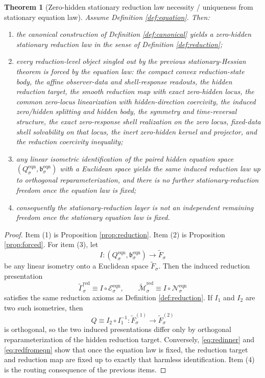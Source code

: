 \documentclass[11pt]{article}
\newcommand{\EqnTarget}[1]{Q_{#1}^{\mathrm{eqn}}}
\newcommand{\EqnPair}[1]{\mathfrak b_{#1}^{\mathrm{eqn}}}
\newcommand{\EqnResidual}[1]{\mathcal E_{#1}^{\mathrm{eqn}}}
\newcommand{\EqnLin}[1]{\mathcal N_{#1}^{\mathrm{eqn}}}
\newtheorem{theorem}{Theorem}
\begin{document}
\begin{theorem}[Zero-hidden stationary reduction law necessity / uniqueness from stationary equation law]
\label{thm:necessity}
Assume Definition \ref{def:equation}. Then:
\begin{enumerate}
    \item the canonical construction of Definition \ref{def:canonical} yields a zero-hidden stationary reduction law in the sense of Definition \ref{def:reduction};
    \item every reduction-level object singled out by the previous stationary-Hessian theorem is forced by the equation law: the compact convex reduction-state body, the affine observer-data and shell-response readouts, the hidden reduction target, the smooth reduction map with exact zero-hidden locus, the common zero-locus linearization with hidden-direction coercivity, the induced zero/hidden splitting and hidden body, the symmetry and time-reversal structure, the exact zero-response shell realization on the zero locus, fixed-data shell solvability on that locus, the inert zero-hidden kernel and projector, and the reduction coercivity inequality;
    \item any linear isometric identification of the paired hidden equation space \((\EqnTarget{\sigma},\EqnPair{\sigma})\) with a Euclidean space yields the same induced reduction law up to orthogonal reparameterization, and there is no further stationary-reduction freedom once the equation law is fixed;
    \item consequently the stationary-reduction layer is not an independent remaining freedom once the stationary equation law is fixed.
\end{enumerate}
\end{theorem}

\begin{proof}
Item (1) is Proposition \ref{prop:reduction}. Item (2) is Proposition \ref{prop:forced}. For item (3), let
\[
I:(\EqnTarget{\sigma},\EqnPair{\sigma})\to\widetilde F_{\sigma}
\]
be any linear isometry onto a Euclidean space \(\widetilde F_{\sigma}\). Then the induced reduction presentation
\[
\widetilde{\Gamma}_{\sigma}^{\mathrm{red}}\equiv I\circ\EqnResidual{\sigma},
\qquad
\widetilde{\mathcal M}_{\sigma}^{\mathrm{red}}\equiv I\circ\EqnLin{\sigma}
\]
satisfies the same reduction axioms as Definition \ref{def:reduction}. If \(I_{1}\) and \(I_{2}\) are two such isometries, then
\[
Q\equiv I_{2}\circ I_{1}^{-1}:\widetilde F_{\sigma}^{(1)}\to\widetilde F_{\sigma}^{(2)}
\]
is orthogonal, so the two induced presentations differ only by orthogonal reparameterization of the hidden reduction target. Conversely, \eqref{eq:redinner} and \eqref{eq:redfromeqn} show that once the equation law is fixed, the reduction target and reduction map are fixed up to exactly that harmless identification. Item (4) is the routing consequence of the previous items.
\end{proof}
\end{document}
